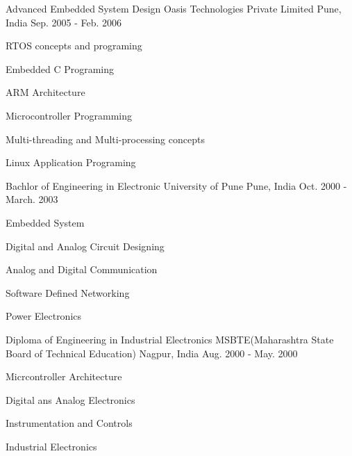 

\begin{cventries}

  \cventry
    {Advanced Embedded System Design} %
    {Oasis Technologies Private Limited} %
    {Pune, India} %
    {Sep. 2005 - Feb. 2006} %
    {
      \begin{cvitems_2} %
        \item {RTOS concepts and programing}
        \item {Embedded C Programing}
        \item {ARM Architecture}
        \item {Microcontroller Programming}
		\item {Multi-threading and Multi-processing concepts}
		\item {Linux Application Programing}
      \end{cvitems_2}
    }


  \cventry
    {Bachlor of Engineering in Electronic} %
    {University of Pune} %
    {Pune, India} %
    {Oct. 2000 - March. 2003} %
    {
      \begin{cvitems_2} %
          \item {Embedded System}
          \item {Digital and Analog Circuit Designing}
          \item {Analog and Digital Communication}
          \item {Software Defined Networking}
          \item {Power Electronics}
      \end{cvitems_2}
    }


  \cventry
    {Diploma of Engineering in Industrial Electronics} %
    {MSBTE(Maharashtra State Board of Technical Education)} %
    {Nagpur, India} %
    {Aug. 2000 - May. 2000} %
    {
      \begin{cvitems_2} %
        \item {Micrcontroller Architecture}
        \item {Digital ans Analog Electronics}
        \item {Instrumentation and Controls}
        \item {Industrial Electronics}
      \end{cvitems_2}
    }

\end{cventries}
